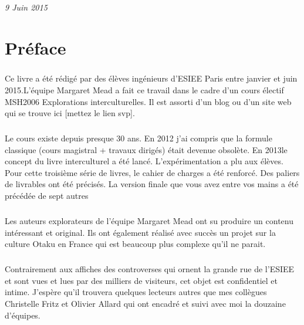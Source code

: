 \documentclass[12pt,twoside]{book}
\begin{document}
\begin{titlepage}
\begin{sffamily}
\begin{center}
\begin{minipage}{0.4\textwidth}
\begin{flushright}
				\emph{9 Juin 2015}
	  \end{flushright}
	\end{minipage}
	\end{center}
	\end{sffamily}
\end{titlepage}

\thispagestyle{empty}

\frontmatter

\thispagestyle{plain}

\chapter*{Préface}

\paragraph{} Ce livre a été rédigé par des élèves ingénieurs d'ESIEE Paris
entre janvier et juin 2015.L'équipe Margaret Mead a fait ce travail dans le
cadre d'un cours électif MSH2006 Explorations interculturelles. Il est assorti
d'un blog ou d'un site web qui se trouve ici [mettez le lien svp].

\paragraph{} Le cours existe depuis presque 30 ans.  En 2012 j'ai compris que
la formule classique (cours magistral + travaux dirigés) était devenue
obsolète.  En 2013le concept du livre interculturel a été lancé.
L'expérimentation a plu aux élèves.  Pour cette troisième série de livres, le
cahier de charges a été renforcé. Des paliers de livrables ont été précisés. La
version finale que vous avez entre vos mains a été précédée de sept autres

\paragraph{} Les auteurs explorateurs de l'équipe Margaret Mead ont su produire
un contenu intéressant et original. Ils ont également réalisé avec succès un
projet sur la culture Otaku en France qui est beaucoup plus complexe qu'il ne
parait.

\paragraph{} Contrairement aux affiches des controverses qui ornent la grande
rue de l'ESIEE et sont vues et lues par des milliers de visiteurs, cet objet
est confidentiel et intime.  J'espère qu'il trouvera quelques lecteurs autres
que mes collègues Christelle Fritz et Olivier Allard qui ont encadré et suivi
avec moi la douzaine d'équipes.
\end{document}
